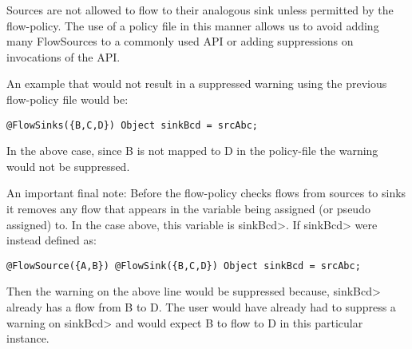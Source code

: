 Sources are not allowed to flow to their analogous sink unless
permitted by the flow-policy.  The use of a policy file in
this manner allows us to avoid adding many FlowSources to a
commonly used API or adding suppressions on invocations of
the API.

An example that would not result in a suppressed warning
using the previous flow-policy file would be:

\begin{Verbatim}
@FlowSinks({B,C,D}) Object sinkBcd = srcAbc;
\end{Verbatim}

In the above case, since B is not mapped to D in the
policy-file the warning would not be suppressed.

An important final note:
Before the flow-policy checks flows from sources to sinks
it removes any flow that appears in the variable being assigned
(or pseudo assigned) to.  In the case above, this variable is
\<sinkBcd>.  If \<sinkBcd> were instead defined as:
\begin{Verbatim}
@FlowSource({A,B}) @FlowSink({B,C,D}) Object sinkBcd = srcAbc;
\end{Verbatim}
Then the warning on the above line would be suppressed because,
\<sinkBcd> already has a flow from B to D.  The user would have
already had to suppress a warning on \<sinkBcd> and would expect
B to flow to D in this particular instance.



